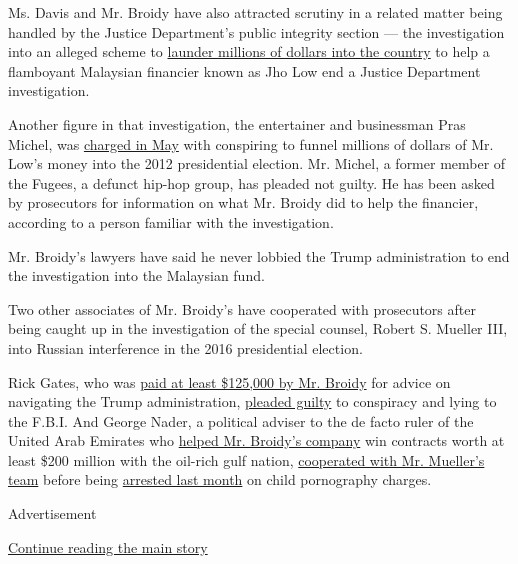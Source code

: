 Ms. Davis and Mr. Broidy have also attracted scrutiny in a related
matter being handled by the Justice Department's public integrity
section --- the investigation into an alleged scheme to
\href{https://www.nytimes.com/2018/11/30/us/politics/broidy-trump-foreign-money.html}{launder
millions of dollars into the country} to help a flamboyant Malaysian
financier known as Jho Low end a Justice Department investigation.

Another figure in that investigation, the entertainer and businessman
Pras Michel, was
\href{https://www.nytimes.com/2019/05/10/us/pras-michel-jho-low-campaign-finance.html}{charged
in May} with conspiring to funnel millions of dollars of Mr. Low's money
into the 2012 presidential election. Mr. Michel, a former member of the
Fugees, a defunct hip-hop group, has pleaded not guilty. He has been
asked by prosecutors for information on what Mr. Broidy did to help the
financier, according to a person familiar with the investigation.

Mr. Broidy's lawyers have said he never lobbied the Trump administration
to end the investigation into the Malaysian fund.

Two other associates of Mr. Broidy's have cooperated with prosecutors
after being caught up in the investigation of the special counsel,
Robert S. Mueller III, into Russian interference in the 2016
presidential election.

Rick Gates, who was
\href{https://www.nytimes.com/2018/07/24/us/politics/rick-gates-elliott-broidy-trump-payments.html}{paid
at least \$125,000 by Mr. Broidy} for advice on navigating the Trump
administration,
\href{https://www.nytimes.com/2019/03/15/us/politics/rick-gates-cooperation-sentencing-delay.html}{pleaded
guilty} to conspiracy and lying to the F.B.I. And George Nader, a
political adviser to the de facto ruler of the United Arab Emirates who
\href{https://www.nytimes.com/2018/03/21/us/politics/george-nader-elliott-broidy-uae-saudi-arabia-white-house-influence.html}{helped
Mr. Broidy's company} win contracts worth at least \$200 million with
the oil-rich gulf nation,
\href{https://www.nytimes.com/2018/03/06/us/politics/george-nader-special-counsel-mueller-cooperating-seychelles.html}{cooperated
with Mr. Mueller's team} before being
\href{https://www.nytimes.com/2019/06/03/us/politics/george-nader-child-pornography-arrest.html}{arrested
last month} on child pornography charges.

Advertisement

\protect\hyperlink{after-bottom}{Continue reading the main story}

